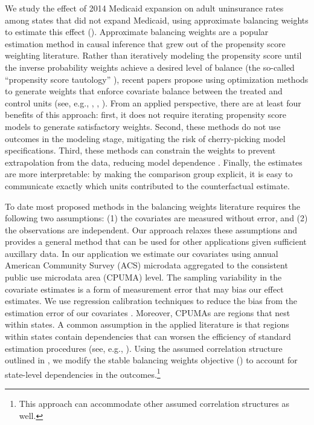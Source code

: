 \documentclass[aoas]{imsart}
\theoremstyle{plain}
\theoremstyle{remark}
\begin{document}
We study the effect of 2014 Medicaid expansion on adult uninsurance rates among states that did not expand Medicaid, using approximate balancing weights to estimate this effect (\cite{wang2017minimal}). Approximate balancing weights are a popular estimation method in causal inference that grew out of the propensity score weighting literature. Rather than iteratively modeling the propensity score until the inverse probability weights achieve a desired level of balance (the so-called ``propensity score tautology'' \cite{imai2014covariate}), recent papers propose using optimization methods to generate weights that enforce covariate balance between the treated and control units (see, e.g., \cite{hainmueller2012entropy}, \cite{imai2014covariate}, \cite{zubizarreta2015stable}). From an applied perspective, there are at least four benefits of this approach: first, it does not require iterating propensity score models to generate satisfactory weights. Second, these methods do not use outcomes in the modeling stage, mitigating the risk of cherry-picking model specifications. Third, these methods can constrain the weights to prevent extrapolation from the data, reducing model dependence \cite{zubizarreta2015stable}. Finally, the estimates are more interpretable: by making the comparison group explicit, it is easy to communicate exactly which units contributed to the counterfactual estimate.

To date most proposed methods in the balancing weights literature requires the following two assumptions: (1) the covariates are measured without error, and (2) the observations are independent. Our approach relaxes these assumptions and provides a general method that can be used for other applications given sufficient auxillary data. In our application we estimate our covariates using annual American Community Survey (ACS) microdata aggregated to the consistent public use microdata area (CPUMA) level. The sampling variability in the covariate estimates is a form of measurement error that may bias our effect estimates. We use regression calibration techniques to reduce the bias from the estimation error of our covariates \cite{gleser1992importance}. Moreover, CPUMAs are regions that nest within states. A common assumption in the applied literature is that regions within states contain dependencies that can worsen the efficiency of standard estimation procedures (see, e.g., \cite{cameron2015practitioner}). Using the assumed correlation structure outlined in \cite{kloek1981ols}, we modify the stable balancing weights objective (\cite{zubizarreta2015stable}) to account for state-level dependencies in the outcomes.\footnote{This approach can accommodate other assumed correlation structures as well.}
\end{document}
